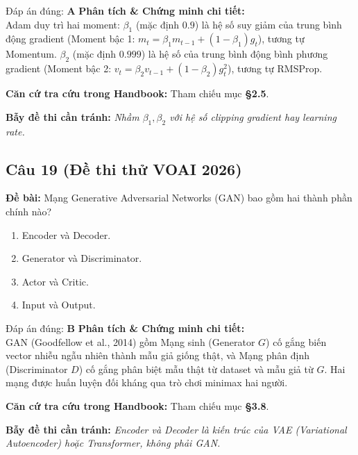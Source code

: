 \documentclass[10pt,a4paper]{article}
\begin{document}
\begin{solbox}{Đáp án đúng: \textbf{A}}
\textbf{Phân tích \& Chứng minh chi tiết:} \\
Adam duy trì hai moment: $\beta_1$ (mặc định $0.9$) là hệ số suy giảm của trung bình động gradient (Moment bậc 1: $m_t = \beta_1 m_{t-1} + (1-\beta_1) g_t$), tương tự Momentum. $\beta_2$ (mặc định $0.999$) là hệ số của trung bình động bình phương gradient (Moment bậc 2: $v_t = \beta_2 v_{t-1} + (1-\beta_2) g_t^2$), tương tự RMSProp.

\vspace{0.4em}
\textbf{Căn cứ tra cứu trong Handbook:} Tham chiếu mục \textbf{§2.5}.

\vspace{0.4em}
\textbf{Bẫy đề thi cần tránh:} \textit{Nhầm $\beta_1, \beta_2$ với hệ số clipping gradient hay learning rate.}
\end{solbox}
\vspace{0.5em}


\subsection*{Câu 19 (Đề thi thử VOAI 2026)}
\textbf{Đề bài:} Mạng Generative Adversarial Networks (GAN) bao gồm hai thành phần chính nào?

\begin{enumerate}[label=\textbf{\Alph*.}]
    \item Encoder và Decoder.
    \item Generator và Discriminator.
    \item Actor và Critic.
    \item Input và Output.
\end{enumerate}

\begin{solbox}{Đáp án đúng: \textbf{B}}
\textbf{Phân tích \& Chứng minh chi tiết:} \\
GAN (Goodfellow et al., 2014) gồm Mạng sinh (Generator $G$) cố gắng biến vector nhiễu ngẫu nhiên thành mẫu giả giống thật, và Mạng phân định (Discriminator $D$) cố gắng phân biệt mẫu thật từ dataset và mẫu giả từ $G$. Hai mạng được huấn luyện đối kháng qua trò chơi minimax hai người.

\vspace{0.4em}
\textbf{Căn cứ tra cứu trong Handbook:} Tham chiếu mục \textbf{§3.8}.

\vspace{0.4em}
\textbf{Bẫy đề thi cần tránh:} \textit{Encoder và Decoder là kiến trúc của VAE (Variational Autoencoder) hoặc Transformer, không phải GAN.}
\end{solbox}
\vspace{0.5em}
\end{document}
